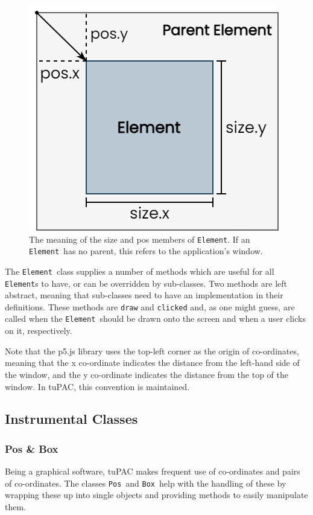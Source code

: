 \documentclass[12pt,a4paper,oneside,openright]{report}
\newcommand{\element}{\texttt{Element}}
\newcommand{\pos}{\texttt{Pos}}
\newcommand{\boxT}{\texttt{Box}}
\begin{document}
\begin{figure}[h]
    \centering
    \includegraphics[scale=0.6]{images/element_demonstration.png}
    \caption{The meaning of the size and pos members of \element. If an \element\ has no parent, this refers to the application's window.}
    \label{fig:element_demo}
\end{figure}

The \element\ class supplies a number of methods which are useful for all \element s to have, or can be overridden by sub-classes. Two methods are left abstract, meaning that sub-classes need to have an implementation in their definitions. These methods are \verb|draw| and \verb|clicked| and, as one might guess, are called when the \element\ should be drawn onto the screen and when a user clicks on it, respectively.

Note that the p5.js library uses the top-left corner as the origin of co-ordinates, meaning that the x co-ordinate indicates the distance from the left-hand side of the window, and the y co-ordinate indicates the distance from the top of the window. In tuPAC, this convention is maintained.

\subsection{Instrumental Classes}
\subsubsection{Pos \& Box}\label{sec:pos}
Being a graphical software, tuPAC makes frequent use of co-ordinates and pairs of co-ordinates. The classes \pos\ and \boxT\ help with the handling of these by wrapping these up into single objects and providing methods to easily manipulate them.
\end{document}
